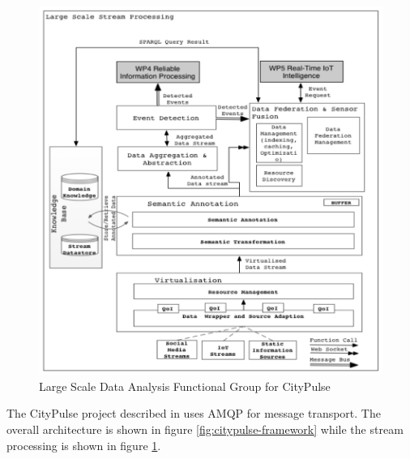 \documentclass[parskip=half]{scrartcl}
\begin{document}
\begin{figure}
	\centering
	\includegraphics[width=\textwidth]{Tsiatsis_2015}
	\caption{Large Scale Data Analysis Functional Group for CityPulse~\cite[p.~25]{Tsiatsis.2015}}
	\label{fig:citypulse-streaming}
\end{figure}

The CityPulse project described in \cite{Tsiatsis.2015, Presser.2014, Presser.2016, Puiu.2016, Puiu.2016b} uses AMQP for message transport. The overall architecture is shown in figure \ref{fig:citypulse-framework} while the stream processing is shown in figure \ref{fig:citypulse-streaming}.


\clearpage
\printbibliography
\end{document}
